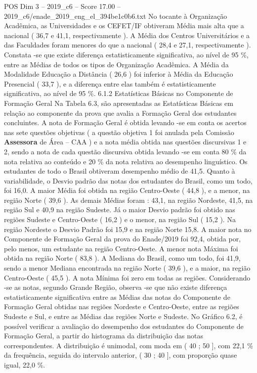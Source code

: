 \begin{textsample}{POS Dim 3 – 2019\_c6 – Score 17.00 – 2019\_c6/enade\_2019\_eng\_el\_394be1c0b6.txt}
No tocante à Organização Acadêmica, as Universidades e os CEFET/IF obtiveram Média mais alta que a nacional ( 36,7 e 41,1, respectivamente ).
A Média dos Centros Universitários e a das Faculdades foram menores do que a nacional ( 28,4 e 27,1, respectivamente ).
Constata -se que existe diferença estatisticamente significativa, ao nível de 95 \%, entre as Médias de todos os tipos de Organização Acadêmica.
A Média da Modalidade Educação a Distância ( 26,6 ) foi inferior à Média da Educação Presencial ( 33,7 ), e a diferença entre elas também é estatisticamente significativa, ao nível de 95 \%. 6.1.2 Estatísticas Básicas no Componente de Formação Geral Na Tabela 6.3, são apresentadas as Estatísticas Básicas em relação ao componente da prova que avalia a Formação Geral dos estudantes concluintes.
A nota de Formação Geral é obtida levando -se em conta os acertos nas sete questões objetivas ( a questão objetiva 1 foi anulada pela Comissão \textbf{Assessora} de Área – CAA ) e a nota média obtida nas questões discursivas 1 e 2, sendo a nota de cada questão discursiva obtida levando -se em conta 80 \% da nota relativa ao conteúdo e 20 \% da nota relativa ao desempenho linguístico.
Os estudantes de todo o Brasil obtiveram desempenho médio de 41,5.
Quanto à variabilidade, o Desvio padrão das notas dos estudantes do Brasil, como um todo, foi 16,0.
A maior Média foi obtida na região Centro-Oeste ( 44,8 ), e a menor, na região Norte ( 39,6 ).
As demais Médias foram : 43,1, na região Nordeste, 41,5, na região Sul e 40,9 na região Sudeste.
Já o maior Desvio padrão foi obtido nas regiões Sudeste e Centro-Oeste ( 16,2 ) e o menor, na região Sul ( 15,2 ).
Na região Nordeste o Desvio Padrão foi 15,9 e na região Norte 15,8.
A maior nota no Componente de Formação Geral da prova do Enade/2019 foi 92,4, obtida por, pelo menos, um estudante na região Centro-Oeste.
A menor nota Máxima foi obtida na região Norte ( 83,8 ).
A Mediana do Brasil, como um todo, foi 41,9, sendo a menor Mediana encontrada na região Norte ( 39,6 ), e a maior, na região Centro-Oeste ( 45,5 ).
A nota Mínima foi zero em todas as regiões.
Considerando -se as notas, segundo Grande Região, observa -se que não existe diferença estatisticamente significativa entre as Médias das notas do Componente de Formação Geral obtidas nas regiões Nordeste e Centro-Oeste, entre as regiões Sudeste e Sul, e entre as Médias das regiões Norte e Sudeste.
No Gráfico 6.2, é possível verificar a avaliação do desempenho dos estudantes do Componente de Formação Geral, a partir do histograma da distribuição das notas correspondentes.
A distribuição é unimodal, com moda em ( 40 ; 50 ], com 22,1 \% da frequência, seguida do intervalo anterior, ( 30 ; 40 ], com proporção quase igual, 22,0 \%.

\end{textsample}

